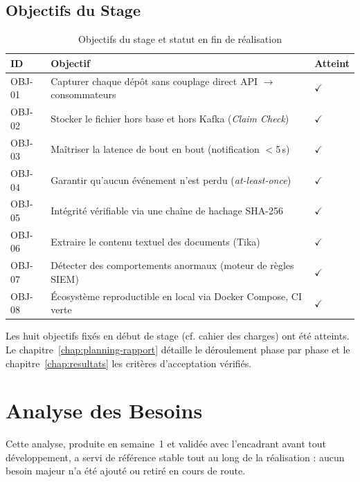 \documentclass[12pt,a4paper,openany]{report}
\begin{document}
    \section{Objectifs du Stage}

    \begin{table}[H]
    \centering
    \begin{tabularx}{\textwidth}{lXl}
    \toprule
    \textbf{ID} & \textbf{Objectif} & \textbf{Atteint} \\
    \midrule
    OBJ-01 & Capturer chaque d\'ep\^ot sans couplage direct API $\to$ consommateurs & $\checkmark$ \\
    OBJ-02 & Stocker le fichier hors base et hors Kafka (\emph{Claim Check}) & $\checkmark$ \\
    OBJ-03 & Ma\^itriser la latence de bout en bout (notification $<$5\,s) & $\checkmark$ \\
    OBJ-04 & Garantir qu'aucun \'ev\'enement n'est perdu (\emph{at-least-once}) & $\checkmark$ \\
    OBJ-05 & Int\'egrit\'e v\'erifiable via une cha\^ine de hachage SHA-256 & $\checkmark$ \\
    OBJ-06 & Extraire le contenu textuel des documents (Tika) & $\checkmark$ \\
    OBJ-07 & D\'etecter des comportements anormaux (moteur de r\`egles SIEM) & $\checkmark$ \\
    OBJ-08 & \'Ecosyst\`eme reproductible en local via Docker Compose, CI verte & $\checkmark$ \\
    \bottomrule
    \end{tabularx}
    \caption{Objectifs du stage et statut en fin de r\'ealisation}
    \end{table}

    Les huit objectifs fix\'es en d\'ebut de stage (cf. cahier des charges) ont \'et\'e atteints. Le chapitre~\ref{chap:planning-rapport} d\'etaille le d\'eroulement phase par phase et le chapitre~\ref{chap:resultats} les crit\`eres d'acceptation v\'erifi\'es.

    \chapter{Analyse des Besoins}
    \label{chap:besoins}

    Cette analyse, produite en semaine~1 et valid\'ee avec l'encadrant avant tout d\'eveloppement, a servi de r\'ef\'erence stable tout au long de la r\'ealisation : aucun besoin majeur n'a \'et\'e ajout\'e ou retir\'e en cours de route.
\end{document}
